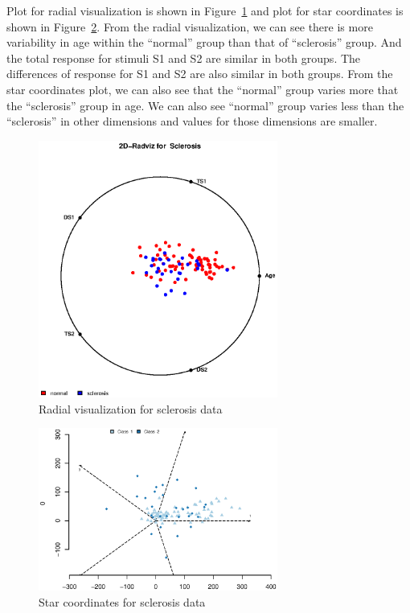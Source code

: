 \documentclass{article}
\begin{document}
\begin{enumerate}[leftmargin = 0 em, label = \arabic*., font = \bfseries]
\begin{enumerate}
        Plot for radial visualization is shown in Figure~\ref{2arad} and plot for star coordinates is shown in Figure~\ref{2acoord}. From the radial visualization, we can see there is more variability in age within the ``normal'' group than that of ``sclerosis'' group. And the total response for stimuli S1 and S2 are similar in both groups. The differences of response for S1 and S2 are also similar in both groups. From the star coordinates plot, we can also see that the ``normal'' group varies more that the ``sclerosis'' group in age. We can also see ``normal'' group varies less than the ``sclerosis'' in other dimensions and values for those dimensions are smaller.  
		\begin{figure}[!htb]
			\centering
			\includegraphics[width = 0.7\textwidth]{2a.eps}
			\caption{Radial visualization for sclerosis data}
			\label{2arad}
		\end{figure}
		\begin{figure}[!htb]
			\centering
			\includegraphics[width = 0.7\textwidth]{2astarcoord.eps}
			\caption{Star coordinates for sclerosis data}
			\label{2acoord}
		\end{figure}
		

\end{enumerate}
\end{enumerate}
\end{document}
